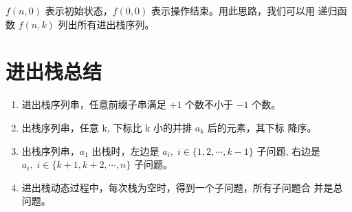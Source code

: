 $f(n,0)$ 表示初始状态，$f(0,0)$ 表示操作结束。用此思路，我们可以用
递归函数 $f(n,k)$ 列出所有进出栈序列。

\section{进出栈总结}

\begin{enumerate}
\item 进出栈序列串，任意前缀子串满足 $+1$ 个数不小于 $-1$ 个数。
\item 出栈序列串，任意 k, 下标比 k 小的并排 $a_k$ 后的元素，其下标
  降序。
\item 出栈序列串，$a_1$ 出栈时，左边是 $a_i,\; i \in
  \{1,2,\cdots,k-1\}$ 子问题, 右边是 $a_i,\; i \in
  \{k+1,k+2,\cdots,n\}$ 子问题。
\item 进出栈动态过程中，每次栈为空时，得到一个子问题，所有子问题合
  并是总问题。
\end{enumerate}

